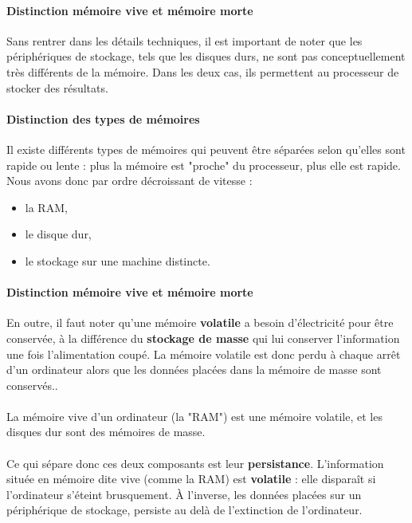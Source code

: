 {  \paragraph{Distinction mémoire vive et mémoire morte} Sans rentrer dans les détails techniques, il
  est important de noter que les périphériques de stockage, tels que les disques durs, ne sont pas
  conceptuellement très différents de la mémoire. Dans les deux cas, ils permettent au processeur de
  stocker des résultats.

  \paragraph{Distinction des types de mémoires} Il existe différents types de mémoires qui peuvent
  être séparées selon qu'elles sont rapide ou lente : plus la mémoire est "proche" du processeur,
  plus elle est rapide. Nous avons donc par ordre décroissant de vitesse :

  \begin{itemize}
    \item la RAM,
    \item le disque dur,
    \item le stockage sur une machine distincte.
  \end{itemize}

  \paragraph{Distinction mémoire vive et mémoire morte}  En outre, il faut noter qu'une mémoire
  \textbf{volatile} a besoin d'électricité pour être conservée, à la différence du \textbf{stockage
  de masse} qui lui conserver l'information une fois l'alimentation coupé. La mémoire volatile est
 donc perdu à chaque arrêt d'un ordinateur alors que les données placées dans la mémoire de masse
 sont conservés..

  \paragraph{} La mémoire vive d'un ordinateur (la "RAM") est une mémoire volatile, et les disques
  dur sont des mémoires de masse.

  \paragraph{} Ce qui sépare donc ces deux composants est leur \textbf{persistance}. L'information
  située en mémoire dite vive (comme la RAM) est \textbf{volatile} : elle disparaît si l'ordinateur s'éteint brusquement. À
  l'inverse, les données placées sur un périphérique de stockage, persiste au delà de l'extinction de
  l'ordinateur.
}

